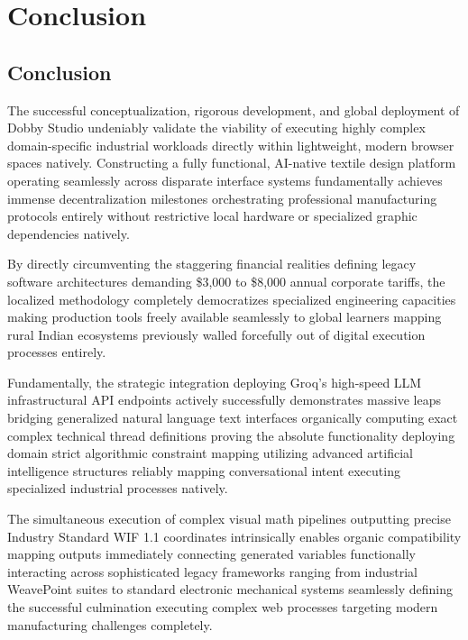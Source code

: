 \chapter{Conclusion}

\section{Conclusion}
The successful conceptualization, rigorous development, and global deployment of Dobby Studio undeniably validate the viability of executing highly complex domain-specific industrial workloads directly within lightweight, modern browser spaces natively. Constructing a fully functional, AI-native textile design platform operating seamlessly across disparate interface systems fundamentally achieves immense decentralization milestones orchestrating professional manufacturing protocols entirely without restrictive local hardware or specialized graphic dependencies natively.

By directly circumventing the staggering financial realities defining legacy software architectures demanding \$3,000 to \$8,000 annual corporate tariffs, the localized methodology completely democratizes specialized engineering capacities making production tools freely available seamlessly to global learners mapping rural Indian ecosystems previously walled forcefully out of digital execution processes entirely.

Fundamentally, the strategic integration deploying Groq's high-speed LLM infrastructural API endpoints actively successfully demonstrates massive leaps bridging generalized natural language text interfaces organically computing exact complex technical thread definitions proving the absolute functionality deploying domain strict algorithmic constraint mapping utilizing advanced artificial intelligence structures reliably mapping conversational intent executing specialized industrial processes natively.

The simultaneous execution of complex visual math pipelines outputting precise Industry Standard WIF 1.1 coordinates intrinsically enables organic compatibility mapping outputs immediately connecting generated variables functionally interacting across sophisticated legacy frameworks ranging from industrial WeavePoint suites to standard electronic mechanical systems seamlessly defining the successful culmination executing complex web processes targeting modern manufacturing challenges completely.

